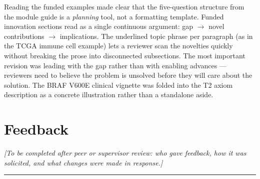 \documentclass[12pt, letterpaper]{article}
\begin{document}
Reading the funded examples made clear that the five-question structure from the module guide
is a \textit{planning} tool, not a formatting template. Funded innovation sections read as a single
continuous argument: gap $\to$ novel contributions $\to$ implications. The underlined topic
phrase per paragraph (as in the TCGA immune cell example) lets a reviewer scan the novelties
quickly without breaking the prose into disconnected subsections. The most important revision was
leading with the gap rather than with enabling advances --- reviewers need to believe the problem
is unsolved before they will care about the solution. The BRAF V600E clinical vignette was
folded into the T2 axiom description as a concrete illustration rather than a standalone aside.

\section*{Feedback}

\textit{[To be completed after peer or supervisor review: who gave feedback, how it was
solicited, and what changes were made in response.]}

\vspace{0.8em}
\hrule
\vspace{0.5em}
\end{document}
